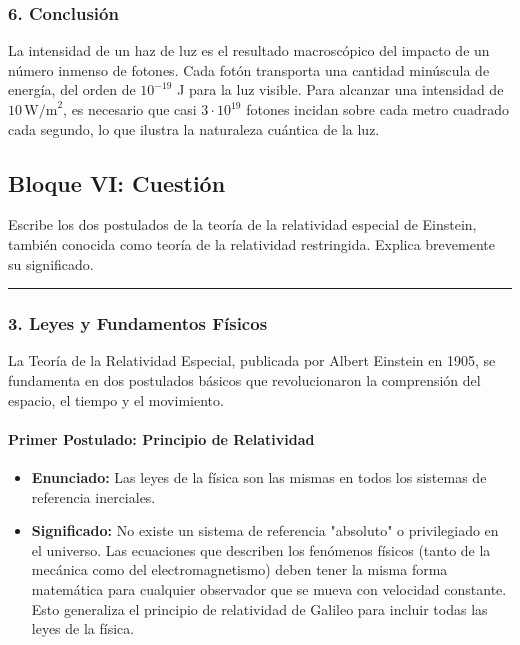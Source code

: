 \subsubsection*{6. Conclusión}
\begin{cajaconclusion}
La intensidad de un haz de luz es el resultado macroscópico del impacto de un número inmenso de fotones. Cada fotón transporta una cantidad minúscula de energía, del orden de $10^{-19}$ J para la luz visible. Para alcanzar una intensidad de $10\,\text{W/m}^2$, es necesario que casi $3 \cdot 10^{19}$ fotones incidan sobre cada metro cuadrado cada segundo, lo que ilustra la naturaleza cuántica de la luz.
\end{cajaconclusion}

\newpage

\subsection{Bloque VI: Cuestión}
\label{subsec:A6_2012_jun_ord}
\begin{cajaenunciado}
Escribe los dos postulados de la teoría de la relatividad especial de Einstein, también conocida como teoría de la relatividad restringida. Explica brevemente su significado.
\end{cajaenunciado}
\hrule

\subsubsection*{3. Leyes y Fundamentos Físicos}
La Teoría de la Relatividad Especial, publicada por Albert Einstein en 1905, se fundamenta en dos postulados básicos que revolucionaron la comprensión del espacio, el tiempo y el movimiento.

\paragraph*{Primer Postulado: Principio de Relatividad}
\begin{itemize}
    \item \textbf{Enunciado:} Las leyes de la física son las mismas en todos los sistemas de referencia inerciales.
    \item \textbf{Significado:} No existe un sistema de referencia "absoluto" o privilegiado en el universo. Las ecuaciones que describen los fenómenos físicos (tanto de la mecánica como del electromagnetismo) deben tener la misma forma matemática para cualquier observador que se mueva con velocidad constante. Esto generaliza el principio de relatividad de Galileo para incluir todas las leyes de la física.
\end{itemize}

